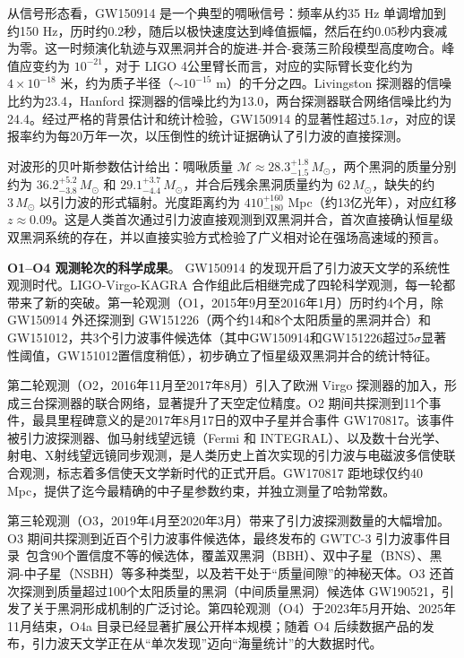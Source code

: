 从信号形态看，GW150914 是一个典型的啁啾信号：频率从约35 Hz 单调增加到约150 Hz，历时约0.2秒，随后以极快速度达到峰值振幅，然后在约0.05秒内衰减为零。这一时频演化轨迹与双黑洞并合的旋进-并合-衰荡三阶段模型高度吻合。峰值应变约为 $10^{-21}$，对于 LIGO 4公里臂长而言，对应的实际臂长变化约为 $4\times10^{-18}$ 米，约为质子半径（$\sim 10^{-15}$ m）的千分之四。Livingston 探测器的信噪比约为23.4，Hanford 探测器的信噪比约为13.0，两台探测器联合网络信噪比约为24.4。经过严格的背景估计和统计检验，GW150914 的显著性超过5.1$\sigma$，对应的误报率约为每20万年一次，以压倒性的统计证据确认了引力波的直接探测。

对波形的贝叶斯参数估计给出：啁啾质量 $\mathcal{M} \approx 28.3^{+1.8}_{-1.5}\,M_\odot$，两个黑洞的质量分别约为 $36.2^{+5.2}_{-3.8}\,M_\odot$ 和 $29.1^{+3.7}_{-4.4}\,M_\odot$，并合后残余黑洞质量约为 $62\,M_\odot$，缺失的约 $3\,M_\odot$ 以引力波的形式辐射。光度距离约为 $410^{+160}_{-180}$ Mpc（约13亿光年），对应红移 $z\approx0.09$。这是人类首次通过引力波直接观测到双黑洞并合，首次直接确认恒星级双黑洞系统的存在，并以直接实验方式检验了广义相对论在强场高速域的预言。

\textbf{O1--O4 观测轮次的科学成果}。
GW150914 的发现开启了引力波天文学的系统性观测时代。LIGO-Virgo-KAGRA 合作组此后相继完成了四轮科学观测，每一轮都带来了新的突破。第一轮观测（O1，2015年9月至2016年1月）历时约4个月，除 GW150914 外还探测到 GW151226（两个约14和8个太阳质量的黑洞并合）和 GW151012，共3个引力波事件候选体（其中GW150914和GW151226超过5$\sigma$显著性阈值，GW151012置信度稍低），初步确立了恒星级双黑洞并合的统计特征。

第二轮观测（O2，2016年11月至2017年8月）引入了欧洲 Virgo 探测器的加入，形成三台探测器的联合网络，显著提升了天空定位精度。O2 期间共探测到11个事件，最具里程碑意义的是2017年8月17日的双中子星并合事件 GW170817。该事件被引力波探测器、伽马射线望远镜（Fermi 和 INTEGRAL）、以及数十台光学、射电、X射线望远镜同步观测，是人类历史上首次实现的引力波与电磁波多信使联合观测，标志着多信使天文学新时代的正式开启。GW170817 距地球仅约40 Mpc，提供了迄今最精确的中子星参数约束，并独立测量了哈勃常数。

第三轮观测（O3，2019年4月至2020年3月）带来了引力波探测数量的大幅增加。O3 期间共探测到近百个引力波事件候选体，最终发布的 GWTC-3 引力波事件目录~\cite{Abbott2021GWTC3}包含90个置信度不等的候选体，覆盖双黑洞（BBH）、双中子星（BNS）、黑洞-中子星（NSBH）等多种类型，以及若干处于“质量间隙”的神秘天体。O3 还首次探测到质量超过100个太阳质量的黑洞（中间质量黑洞）候选体 GW190521，引发了关于黑洞形成机制的广泛讨论。第四轮观测（O4）于2023年5月开始、2025年11月结束，O4a 目录已经显著扩展公开样本规模；随着 O4 后续数据产品的发布，引力波天文学正在从“单次发现”迈向“海量统计”的大数据时代。

